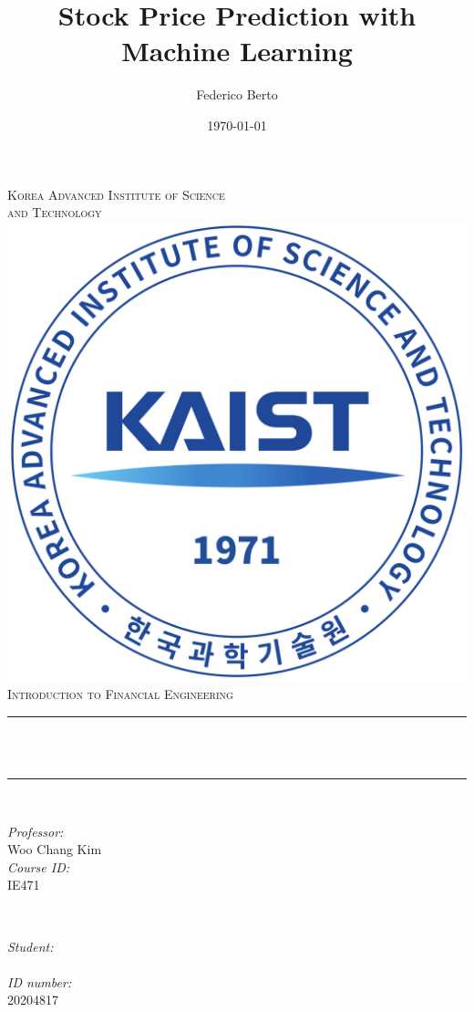 \documentclass[12pt]{article}
\title{Stock Price Prediction with Machine Learning}
\author{Federico Berto}
\date{\today}
\makeatletter
\newcommand{\professor}{Woo Chang Kim}
\newcommand{\studentid}{20204817}
\newcommand{\coursename}{Introduction to Financial Engineering}
\newcommand{\courseid}{IE471}
\newcommand{\firstuniversityline}{Korea Advanced Institute of Science} %
\newcommand{\seconduniversityline}{and Technology} %
\let\thetitle\@title
\let\theauthor\@author
\makeatother
\begin{document}
\begin{titlepage}
	\centering
    \textsc{\LARGE  \firstuniversityline \\ \smallskip \seconduniversityline}\\[1 cm]	%
    \includegraphics[scale = 0.18]{images/university_main_logo.png}\\[1.5 cm]	%
    
	\textsc{\Large \coursename}\\[0.5 cm]
	\rule{\linewidth}{0.2 mm} \\[0.4 cm]
	{ \huge \bfseries {\thetitle}}\\
	\rule{\linewidth}{0.2 mm} \\[1.5 cm]
	
	\begin{minipage}{0.5\textwidth}
		\begin{flushleft} \large
			\emph{Professor:}\\
		    \professor \\ [0.5cm]
            \emph{Course ID:}\\
            \courseid
			\end{flushleft}
			\end{minipage}~
			\begin{minipage}{0.4\textwidth}
			\begin{flushright} \large
			\emph{Student:} \\
			\theauthor \\[0.5cm]
			\emph{ID number:}\\
			\studentid \\
		\end{flushright}
	\end{minipage}\\[2 cm]
	
\end{titlepage}
\end{document}
